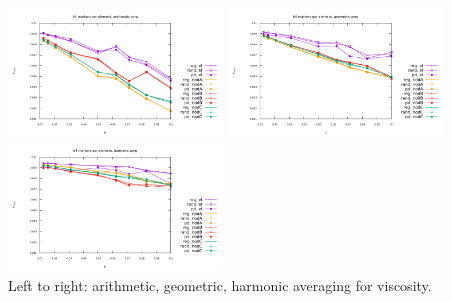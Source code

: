 \begin{center}
\includegraphics[width=5.7cm]{python_codes/fieldstone_13/results/vrms_am} 
\includegraphics[width=5.7cm]{python_codes/fieldstone_13/results/vrms_gm} 
\includegraphics[width=5.7cm]{python_codes/fieldstone_13/results/vrms_hm}\\
{\captionfont Left to right: arithmetic, geometric, harmonic averaging for viscosity.}
\end{center}
